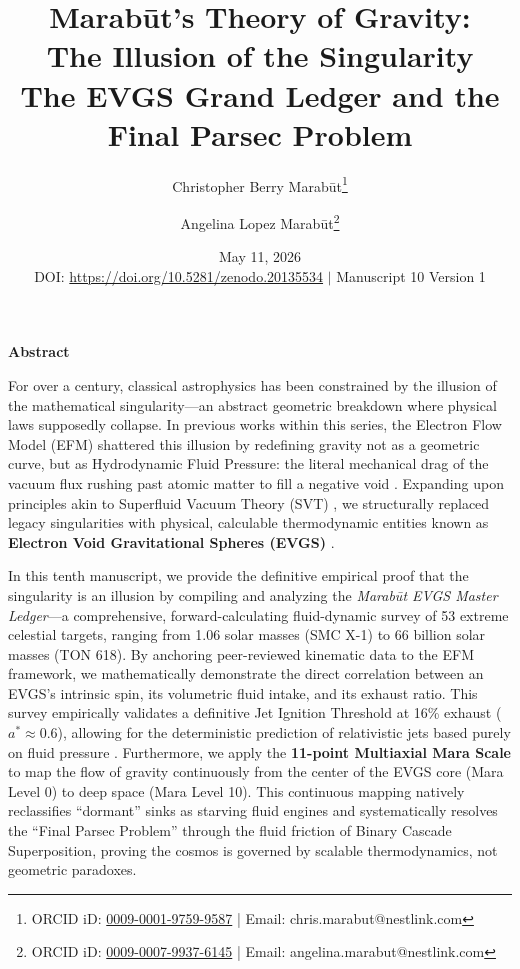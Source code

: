 \documentclass[11pt, a4paper]{article}
\title{\textbf{Marab\={u}t's Theory of Gravity: \\ The Illusion of the Singularity} \\[1em] \large{The EVGS Grand Ledger and the Final Parsec Problem}}
\author[1]{Christopher Berry Marab\={u}t\thanks{ORCID iD: \href{https://orcid.org/0009-0001-9759-9587}{0009-0001-9759-9587} | Email: chris.marabut@nestlink.com}}
\author[1]{Angelina Lopez Marab\={u}t\thanks{ORCID iD: \href{https://orcid.org/0009-0007-9937-6145}{0009-0007-9937-6145} | Email: angelina.marabut@nestlink.com}}
\affil[1]{Independent Researchers}
\date{May 11, 2026 \\[1.5em] \small{DOI: \url{https://doi.org/10.5281/zenodo.20135534} $|$ Manuscript 10 Version 1}}
\begin{document}

\maketitle

\begingroup
  \small
  \begin{center}
    \textbf{Abstract}
  \end{center}
  \vspace{-0.5em}

  For over a century, classical astrophysics has been constrained by the illusion of the mathematical singularity—an abstract geometric breakdown where physical laws supposedly collapse. In previous works within this series, the Electron Flow Model (EFM) shattered this illusion by redefining gravity not as a geometric curve, but as Hydrodynamic Fluid Pressure: the literal mechanical drag of the vacuum flux rushing past atomic matter to fill a negative void \cite{marabut2026m1}. Expanding upon principles akin to Superfluid Vacuum Theory (SVT) \cite{sinha1975}, we structurally replaced legacy singularities with physical, calculable thermodynamic entities known as \textbf{Electron Void Gravitational Spheres (EVGS)} \cite{marabut2026m4}. 

  In this tenth manuscript, we provide the definitive empirical proof that the singularity is an illusion by compiling and analyzing the \textit{Marab\={u}t EVGS Master Ledger}—a comprehensive, forward-calculating fluid-dynamic survey of 53 extreme celestial targets, ranging from 1.06 solar masses (SMC X-1) to 66 billion solar masses (TON 618). By anchoring peer-reviewed kinematic data to the EFM framework, we mathematically demonstrate the direct correlation between an EVGS's intrinsic spin, its volumetric fluid intake, and its exhaust ratio. This survey empirically validates a definitive Jet Ignition Threshold at 16\% exhaust ($a^* \approx 0.6$), allowing for the deterministic prediction of relativistic jets based purely on fluid pressure \cite{marabut2026m3, marabut2026m6}. Furthermore, we apply the \textbf{11-point Multiaxial Mara Scale} to map the flow of gravity continuously from the center of the EVGS core (Mara Level 0) to deep space (Mara Level 10). This continuous mapping natively reclassifies ``dormant'' sinks as starving fluid engines and systematically resolves the ``Final Parsec Problem'' \cite{begelman1980} through the fluid friction of Binary Cascade Superposition, proving the cosmos is governed by scalable thermodynamics, not geometric paradoxes.
\endgroup
\end{document}
